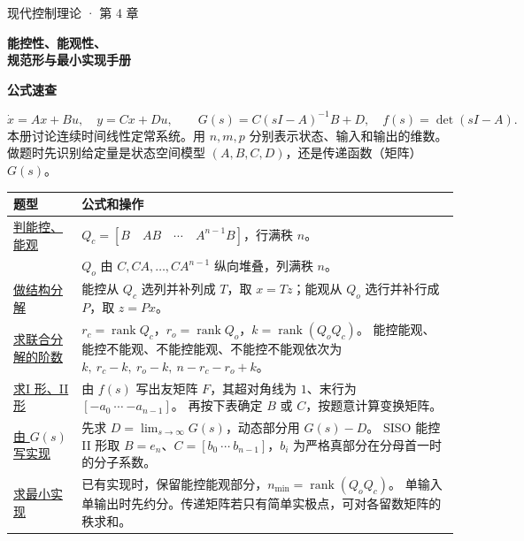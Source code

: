 \documentclass[UTF8,a4paper,12pt,fontset=fandol]{ctexart}
\DeclareMathOperator{\rank}{rank}
\begin{document}
\color{ink}
\setlength{\abovedisplayskip}{7pt plus 2pt minus 1pt}
\setlength{\belowdisplayskip}{7pt plus 2pt minus 1pt}
\setlength{\abovedisplayshortskip}{5pt plus 1pt}
\setlength{\belowdisplayshortskip}{5pt plus 1pt}
\thispagestyle{opening}

{\large\color{teal}现代控制理论 · 第 4 章\par}
\vspace{5pt}
{\fontsize{26}{33}\selectfont\bfseries 能控性、能观性、\\规范形与最小实现手册\par}
\vspace{5pt}
{\large\bfseries 公式速查\par}

\[
  \dot x=Ax+Bu,\quad y=Cx+Du,\qquad
  G(s)=C(sI-A)^{-1}B+D,\quad f(s)=\det(sI-A).
\]
本册讨论连续时间线性定常系统。用 $n,m,p$ 分别表示状态、输入和输出的维数。
做题时先识别给定量是状态空间模型 $(A,B,C,D)$，还是传递函数（矩阵）$G(s)$。

\begingroup
\setlength{\extrarowheight}{6pt}
\begin{tabularx}{\linewidth}{@{}>{\raggedright\arraybackslash}p{35mm}>{\raggedright\arraybackslash}X@{}}
\toprule
\textbf{题型} & \textbf{公式和操作} \\
\midrule
\hyperref[sec:tests]{判能控、能观} &
  $Q_c=[B\quad AB\quad\cdots\quad A^{n-1}B]$，行满秩 $n$。\\
& $Q_o$ 由 $C,CA,\ldots,CA^{n-1}$ 纵向堆叠，列满秩 $n$。\\
\hyperref[sec:decomp]{做结构分解} &
  能控从 $Q_c$ 选列并补列成 $T$，取 $x=Tz$；能观从 $Q_o$ 选行并补行成 $P$，取 $z=Px$。\\
\hyperref[sec:kalman]{求联合分解的阶数} &
  $r_c=\rank Q_c$，$r_o=\rank Q_o$，$k=\rank(Q_oQ_c)$。
  能控能观、能控不能观、不能控能观、不能控不能观依次为 $k,\ r_c-k,\ r_o-k,\ n-r_c-r_o+k$。\\
\hyperref[sec:canonical]{求I 形、II 形} &
  由 $f(s)$ 写出友矩阵 $F$，其超对角线为 $1$、末行为 $[-a_0\ \cdots\ {-a_{n-1}}]$。
  再按下表确定 $B$ 或 $C$，按题意计算变换矩阵。\\
\hyperref[sec:realization]{由 $G(s)$ 写实现} &
  先求 $D=\lim_{s\to\infty}G(s)$，动态部分用 $G(s)-D$。
  SISO 能控 II 形取 $B=e_n$、$C=[b_0\ \cdots\ b_{n-1}]$，$b_i$ 为严格真部分在分母首一时的分子系数。\\
\hyperref[sec:minimal]{求最小实现} &
  已有实现时，保留能控能观部分，$n_{\min}=\rank(Q_oQ_c)$。
  单输入单输出时先约分。传递矩阵若只有简单实极点，可对各留数矩阵的秩求和。\\
\bottomrule
\end{tabularx}
\endgroup
\end{document}
